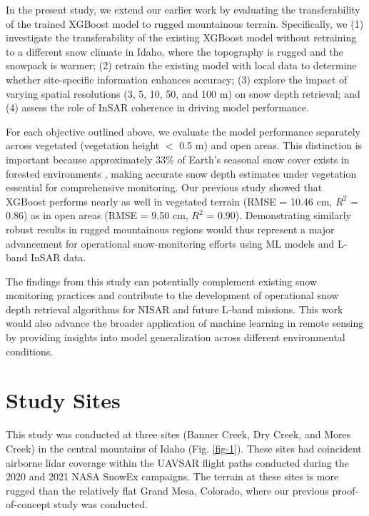 \documentclass[lettersize,journal]{IEEEtran}
\begin{document}
In the present study, we extend our earlier work by evaluating the transferability of the trained XGBoost model to rugged mountainous terrain. Specifically, we (1) investigate the transferability of the existing XGBoost model without retraining to a different snow climate in Idaho, where the topography is rugged and the snowpack is warmer; (2) retrain the existing model with local data to determine whether site-specific information enhances accuracy; (3) explore the impact of varying spatial resolutions (3, 5, 10, 50, and 100 m) on snow depth retrieval; and (4) assess the role of InSAR coherence in driving model performance. 

For each objective outlined above, we evaluate the model performance separately across vegetated (vegetation height $<$ 0.5 m) and open areas. This distinction is important because approximately 33\% of Earth's seasonal snow cover exists in forested environments \cite{bonnell2024band}, making accurate snow depth estimates under vegetation essential for comprehensive monitoring. Our previous study \cite{alabi5advancing} showed that XGBoost performs nearly as well in vegetated terrain (RMSE = 10.46 cm, $R^2$ = 0.86) as in open areas (RMSE = 9.50 cm, $R^2$ = 0.90). Demonstrating similarly robust results in rugged mountainous regions would thus represent a major advancement for operational snow-monitoring efforts using ML models and L-band InSAR data.

The findings from this study can potentially complement existing snow monitoring practices and contribute to the development of operational snow depth retrieval algorithms for NISAR and future L-band missions. This work would also advance the broader application of machine learning in remote sensing by providing insights into model generalization across different environmental conditions.


\section{Study Sites}

This study was conducted at three sites (Banner Creek, Dry Creek, and Mores Creek) in the central mountains of Idaho (Fig. \ref{fig-1}). These sites had coincident airborne lidar coverage within the UAVSAR flight paths conducted during the 2020 and 2021 NASA SnowEx campaigns. The terrain at these sites is more rugged than the relatively flat Grand Mesa, Colorado, where our previous proof-of-concept study \cite{alabi5advancing} was conducted.
\end{document}

